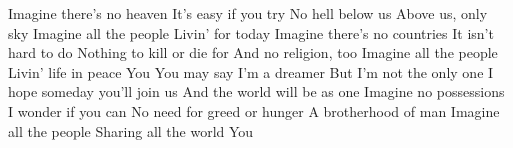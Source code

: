 \ve{}
Imagine there's no heaven
It's easy if you try
No hell below us
Above us, only sky
Imagine all the people
Livin' for today
\ve{}
Imagine there's no countries
It isn't hard to do
Nothing to kill or die for
And no religion, too
Imagine all the people
Livin' life in peace
You
\cho{}
You may say I'm a dreamer
But I'm not the only one
I hope someday you'll join us
And the world will be as one
\ve{}
Imagine no possessions
I wonder if you can
No need for greed or hunger
A brotherhood of man
Imagine all the people
Sharing all the world
You
\cho{}
\esong{}